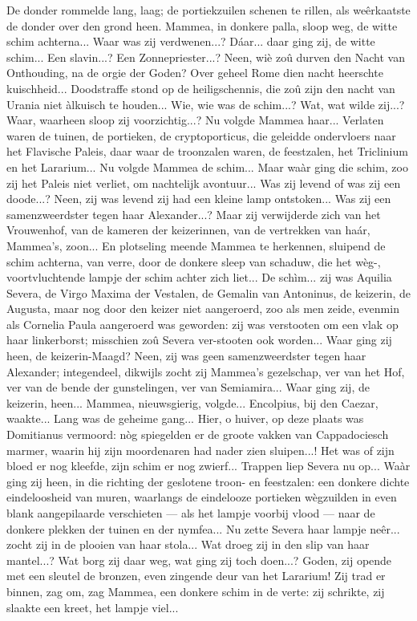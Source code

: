 \documentclass[a4paper, 12pt, oneside, dutch]{article}
\begin{document}
De donder rommelde lang, laag; de portiekzuilen schenen te rillen, als weêrkaatste de donder over den grond heen. Mammea, in donkere palla, sloop weg, de witte schim achterna... Waar was zij verdwenen...? Dáar... daar ging zij, de witte schim... Een slavin...? Een Zonnepriester...? Neen, wiè zoû durven den Nacht van Onthouding, na de orgie der Goden? Over geheel Rome dien nacht heerschte kuischheid... Doodstraffe stond op de heiligschennis, die zoû zijn den nacht van Urania niet àlkuisch te houden... Wie, wie was de schim...? Wat, wat wilde zij...? Waar, waarheen sloop zij voorzichtig...? Nu volgde Mammea haar... Verlaten waren de tuinen, de portieken, de cryptoporticus, die geleidde ondervloers naar het Flavische Paleis, daar waar de troonzalen waren, de feestzalen, het Triclinium en het Lararium... Nu volgde Mammea de schim... Maar waàr ging die schim, zoo zij het Paleis niet verliet, om nachtelijk avontuur... Was zij levend of was zij een doode...? Neen, zij was levend zij had een kleine lamp ontstoken... Was zij een samenzweerdster tegen haar Alexander...? Maar zij verwijderde zich van het Vrouwenhof, van de kameren der keizerinnen, van de vertrekken van haár, Mammea's, zoon... En plotseling meende Mammea te herkennen, sluipend de schim achterna, van verre, door de donkere sleep van schaduw, die het wèg-, voortvluchtende lampje der schim achter zich liet... De schìm... zij was Aquilia Severa, de Virgo Maxima der Vestalen, de Gemalin van Antoninus, de keizerin, de Augusta, maar nog door den keizer niet aangeroerd, zoo als men zeide, evenmin als Cornelia Paula aangeroerd was geworden: zij was verstooten om een vlak op haar linkerborst; misschien zoû Severa ver-stooten ook worden... Waar ging zij heen, de keizerin-Maagd? Neen, zij was geen samenzweerdster tegen haar Alexander; integendeel, dikwijls zocht zij Mammea's gezelschap, ver van het Hof, ver van de bende der gunstelingen, ver van Semiamira... Waar ging zij, de keizerin, heen... Mammea, nieuwsgierig, volgde... Encolpius, bij den Caezar, waakte... Lang was de geheime gang... Hier, o huiver, op deze plaats was Domitianus vermoord: nòg spiegelden er de groote vakken van Cappadociesch marmer, waarin hij zijn moordenaren had nader zien sluipen...! Het was of zijn bloed er nog kleefde, zijn schim er nog zwierf... Trappen liep Severa nu op... Waàr ging zij heen, in die richting der geslotene troon- en feestzalen: een donkere dichte eindeloosheid van muren, waarlangs de eindelooze portieken wègzuilden in even blank aangepilaarde verschieten --- als het lampje voorbij vlood --- naar de donkere plekken der tuinen en der nymfea... Nu zette Severa haar lampje neêr... zocht zij in de plooien van haar stola... Wat droeg zij in den slip van haar mantel...? Wat borg zij daar weg, wat ging zij toch doen...? Goden, zij opende met een sleutel de bronzen, even zingende deur van het Lararium! Zij trad er binnen, zag om, zag Mammea, een donkere schim in de verte: zij schrikte, zij slaakte een kreet, het lampje viel...
\end{document}
